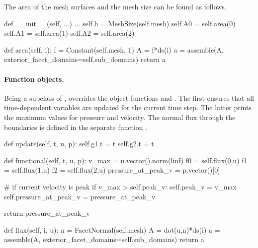 The area of the mesh surfaces and the mesh size can be found as follows.
\begin{python}
def __init__(self, ...)
    ...
    self.h = MeshSize(self.mesh)
    self.A0 = self.area(0)
    self.A1 = self.area(1)
    self.A2 = self.area(2)

def area(self, i):
    f = Constant(self.mesh, 1)
    A = f*ds(i)
    a = assemble(A, exterior_facet_domains=self.sub_domains)
    return a
\end{python}

\paragraph{Function objects.}
Being a subclass of ,  overrides the object
functions  and . The first ensures that all
time-dependent variables are updated for the current time step. The latter
prints the maximum values for pressure and velocity. The normal flux
through the boundaries is defined in the separate function .
\begin{python}
def update(self, t, u, p):
    self.g1.t = t
    self.g2.t = t

def functional(self, t, u, p):
    v_max = u.vector().norm(linf)
    f0 = self.flux(0,u)
    f1 = self.flux(1,u)
    f2 = self.flux(2,u)
    pressure_at_peak_v = p.vector()[0]

    # if current velocity is peak
    if v_max > self.peak_v:
        self.peak_v = v_max
        self.pressure_at_peak_v = pressure_at_peak_v

    return pressure_at_peak_v

def flux(self, i, u):
    n = FacetNormal(self.mesh)
    A = dot(u,n)*ds(i)
    a = assemble(A, exterior_facet_domains=self.sub_domains)
    return a
\end{python}

